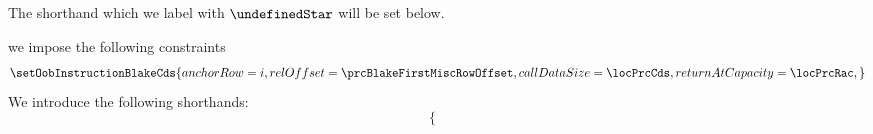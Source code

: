 \begin{description}
\begin{description}
				\saNote{} The shorthand \locOobResultHubSuccess{} which we label with $\undefinedStar$ will be set below.
			\item[\underline{Setting the \oobMod{} instruction and shorthands:}] 
				we impose the following constraints
				\[
					\setOobInstructionBlakeCds {
						anchorRow        = i                           ,
						relOffset        = \prcBlakeFirstMiscRowOffset ,
						callDataSize     = \locPrcCds                  ,
						returnAtCapacity = \locPrcRac                  ,
					}
					\label{hub: instruction handling: call: precompiles: blake: hub success call}
				\]
				We introduce the following shorthands:
				\[
					\left\{ \begin{array}{lcl} \label{hub: instruction handling: call: precompiles: blake: shorthands}

\end{array}\]
\end{description}
\end{description}
